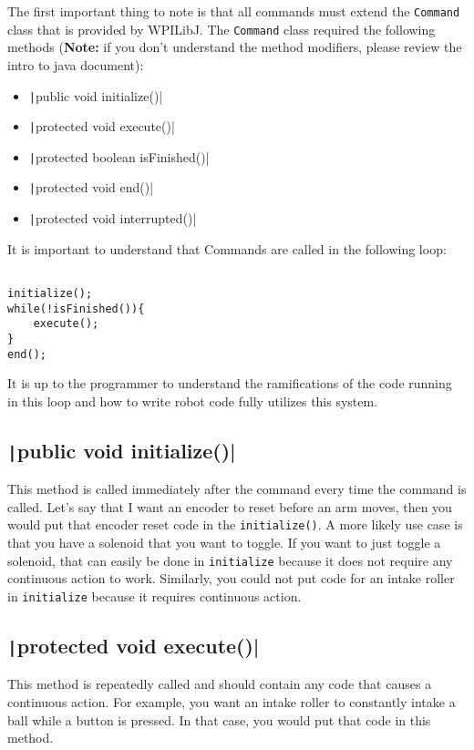 \documentclass[11pt,fleqn]{article}
\newcommand{\mil}[2][java]{\texttt|#2|}
\begin{document}
The first important thing to note is that all commands must extend the \texttt{Command} class that
is provided by WPILibJ. The \texttt{Command} class required the following methods (\textbf{Note:}
if you don't understand the method modifiers, please review the intro to java document):
\begin{itemize}
    \item
    \mil{public void initialize()}

    \item
    \mil{protected void execute()}

    \item
    \mil{protected boolean isFinished()}

    \item
    \mil{protected void end()}

    \item
    \mil{protected void interrupted()}
\end{itemize}

It is important to understand that Commands are called in the following loop:

\begin{verbatim}

initialize();
while(!isFinished()){
    execute();
}
end();
\end{verbatim}

It is up to the programmer to understand the ramifications of the code running in this loop and how
to write robot code fully utilizes this system. 

\subsection{\mil{public void initialize()}}
This method is called immediately after the command every time the command is called. Let's say
that I want an encoder to reset before an arm moves, then you would put that encoder reset code in
the \texttt{initialize()}. A more likely use case is that you have a solenoid that you want to
toggle. If you want to just toggle a solenoid, that can easily be done in \texttt{initialize}
because it does not require any continuous action to work. Similarly, you could not put code for an
intake roller in \texttt{initialize} because it requires continuous action. 

\subsection{\mil{protected void execute()}}
This method is repeatedly called and should contain any code that causes a continuous action. For
example, you want an intake roller to constantly intake a ball while a button is pressed. In that
case, you would put that code in this method. 
\end{document}
